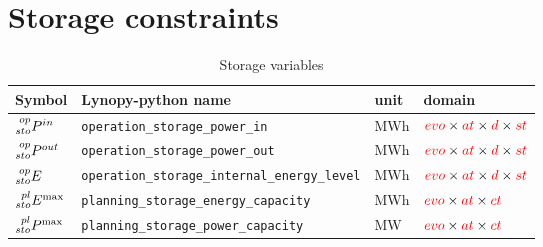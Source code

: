 \documentclass{article}
\begin{document}
\section{Storage constraints}
\footnotesize
\begin{table}[h]
\footnotesize
  \centering
    \caption{Storage variables}
  \begin{tabular}{llll}
    \hline
    \textbf{Symbol} & \textbf{Lynopy-python name} & \textbf{unit}  & \textbf{domain} \\ \hline
    
    $\prescript{op}{sto}{P^{in}}$ & \verb|operation_storage_power_in| & MWh & $\textcolor{red}{evo} \times \textcolor{red}{at} \times \textcolor{red}{d} \times \textcolor{red}{st}$ \\ 
    
    $\prescript{op}{sto}{P^{out}}$  & \verb|operation_storage_power_out|& MWh & $\textcolor{red}{evo} \times \textcolor{red}{at} \times \textcolor{red}{d} \times \textcolor{red}{st}$\\ 
    
    $\prescript{op}{sto}{E}$  & \verb|operation_storage_internal_energy_level|& MWh & $\textcolor{red}{evo} \times \textcolor{red}{at} \times \textcolor{red}{d} \times \textcolor{red}{st}$ \\ \hline
     
    $\prescript{pl}{sto}{E^{\max}}$ & \verb|planning_storage_energy_capacity|& MWh & $\textcolor{red}{evo} \times \textcolor{red}{at} \times \textcolor{red}{ct}$\\ 
    
    $\prescript{pl}{sto}{P^{\max}}$ & \verb|planning_storage_power_capacity|& MW & $\textcolor{red}{evo} \times \textcolor{red}{at} \times \textcolor{red}{ct}$ \\ \hline
  \end{tabular}
\end{table}
\end{document}
